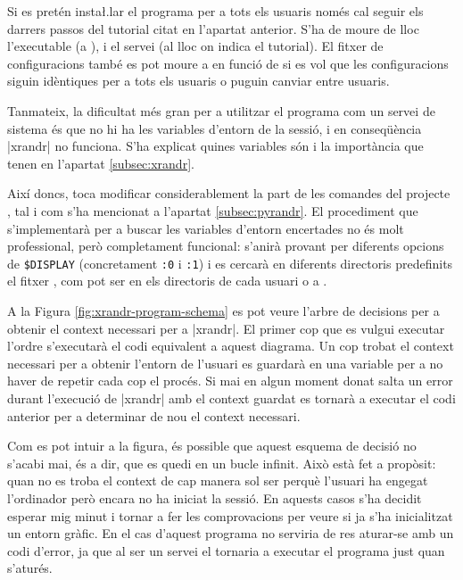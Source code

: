 Si es pretén insta\l.lar el programa per a tots els usuaris només cal seguir
els darrers passos del tutorial citat en l'apartat anterior. S'ha de moure de
lloc l'executable (a ), i el servei (al lloc on indica el
tutorial). El fitxer de configuracions també es pot moure a  en funció
de si es vol que les configuracions siguin idèntiques per a tots els usuaris o
puguin canviar entre usuaris.

Tanmateix, la dificultat més gran per a utilitzar el programa com un servei de
sistema és que no hi ha les variables d'entorn de la sessió, i en conseqüència
\ord|xrandr| no funciona. S'ha explicat quines variables són i la importància
que tenen en l'apartat \ref{subsec:xrandr}.

Així doncs, toca modificar considerablement la part de les comandes del
projecte , tal i com s'ha mencionat a l'apartat \ref{subsec:pyrandr}.
El procediment que s'implementarà per a buscar les variables d'entorn encertades
no és molt professional, però completament funcional: s'anirà provant per diferents
opcions de \verb|$DISPLAY| (concretament \verb|:0| i \verb|:1|) i es cercarà
en diferents directoris predefinits el fitxer , com pot ser
en els directoris de cada usuari o a .



A la Figura \ref{fig:xrandr-program-schema} es pot veure l'arbre de decisions
per a obtenir el context necessari per a \ord|xrandr|. El primer cop que es
vulgui executar l'ordre s'executarà el codi equivalent a aquest diagrama.
Un cop trobat el context necessari per a obtenir l'entorn de l'usuari es guardarà
en una variable per a no haver de repetir cada cop el procés. Si mai en algun
moment donat salta un error durant l'execució de \ord|xrandr| amb el context
guardat es tornarà a executar el codi anterior per a determinar de nou el
context necessari.

Com es pot intuir a la figura, és possible que aquest esquema de decisió no
s'acabi mai, és a dir, que es quedi en un bucle infinit. Això està fet a
propòsit: quan no es troba el context de cap manera sol ser perquè l'usuari ha
engegat l'ordinador però encara no ha iniciat la sessió. En aquests casos s'ha
decidit esperar mig minut i tornar a fer les comprovacions per veure si ja
s'ha inicialitzat un entorn gràfic. En el cas d'aquest programa no serviria de
res aturar-se amb un codi d'error, ja que al ser un servei el 
tornaria a executar el programa just quan s'aturés.

